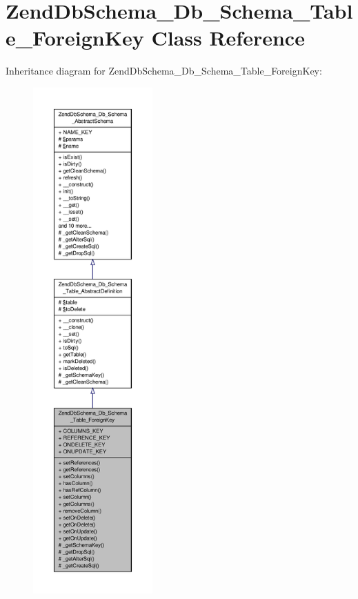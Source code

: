 \hypertarget{classZendDbSchema__Db__Schema__Table__ForeignKey}{\section{Zend\-Db\-Schema\-\_\-\-Db\-\_\-\-Schema\-\_\-\-Table\-\_\-\-Foreign\-Key Class Reference}
\label{classZendDbSchema__Db__Schema__Table__ForeignKey}
}


Inheritance diagram for Zend\-Db\-Schema\-\_\-\-Db\-\_\-\-Schema\-\_\-\-Table\-\_\-\-Foreign\-Key\-:\nopagebreak
\begin{figure}[H]
\begin{center}
\leavevmode
\includegraphics[height=550pt]{classZendDbSchema__Db__Schema__Table__ForeignKey__inherit__graph}
\end{center}
\end{figure}



